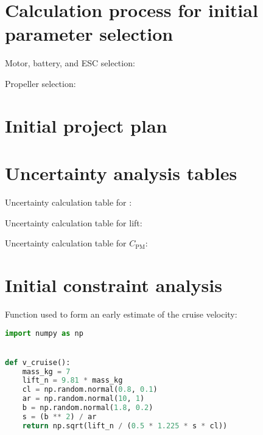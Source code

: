 \documentclass[../main.tex]{subfiles}
\begin{document}
\section{Calculation process for initial parameter selection} \label{appendix:calculation-process-for-initial-parameter-selection}

Motor, battery, and ESC selection:


Propeller selection:


\section{Initial project plan} \label{appendix:initial-project-plan}


\section{Uncertainty analysis tables} \label{appendix:uncertainty-analysis-tables}

Uncertainty calculation table for \cd:


Uncertainty calculation table for lift:


Uncertainty calculation table for $C_\mathrm{PM}$:


\section{Initial constraint analysis} \label{appendix:initial-constraint-analysis}

Function used to form an early estimate of the cruise velocity:

\begin{lstlisting}[language=python,firstnumber=1]
import numpy as np


def v_cruise():
    mass_kg = 7
    lift_n = 9.81 * mass_kg
    cl = np.random.normal(0.8, 0.1)
    ar = np.random.normal(10, 1)
    b = np.random.normal(1.8, 0.2)
    s = (b ** 2) / ar
    return np.sqrt(lift_n / (0.5 * 1.225 * s * cl))
\end{lstlisting}
\end{document}
